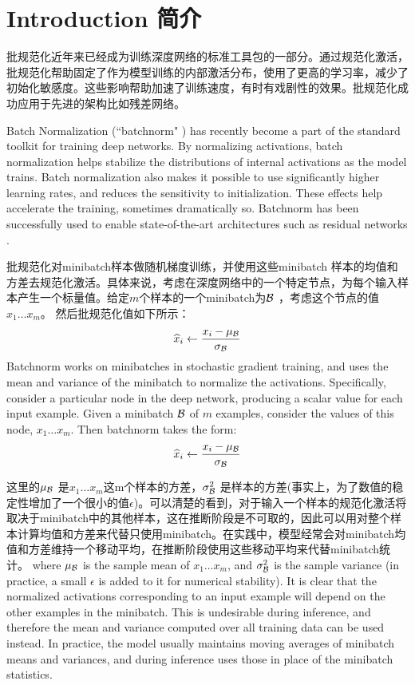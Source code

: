 \section{Introduction 简介}
批规范化近年来已经成为训练深度网络的标准工具包的一部分。通过规范化激活，批规范化帮助固定了作为模型训练的内部激活分布，使用了更高的学习率，减少了初始化敏感度。这些影响帮助加速了训练速度，有时有戏剧性的效果。批规范化成功应用于先进的架构比如残差网络。

Batch Normalization (``batchnorm" \cite{batchnorm}) has recently become a part of the standard toolkit for training deep networks. By normalizing activations, batch normalization helps stabilize the distributions of internal activations as the model trains. Batch normalization also makes it possible to use significantly higher learning rates, and reduces the sensitivity to initialization. These effects help accelerate the training, sometimes dramatically so. Batchnorm has been successfully used to enable  state-of-the-art architectures such as residual networks \cite{resnet}.

批规范化对minibatch样本做随机梯度训练，并使用这些minibatch 样本的均值和方差去规范化激活。具体来说，考虑在深度网络中的一个特定节点，为每个输入样本产生一个标量值。给定$m$个样本的一个minibatch为$\mathcal{B}$ ，考虑这个节点的值$x_1\ldots x_m$。 然后批规范化值如下所示：
$$
\widehat{x}_i \leftarrow \frac{x_i-\mu_{\mathcal{B}}}{\sigma_{\mathcal{B}}}
$$
Batchnorm works on minibatches in stochastic gradient training, and uses the mean and variance of the minibatch  to normalize the activations. Specifically, consider a particular node in the deep network, producing a scalar value for each input example. Given a minibatch $\mathcal{B}$ of $m$ examples, consider the values of this node, $x_1\ldots x_m$. Then batchnorm takes the form:
$$
\widehat{x}_i \leftarrow \frac{x_i-\mu_{\mathcal{B}}}{\sigma_{\mathcal{B}}}
$$

这里的$\mu_{\mathcal{B}}$ 是$x_1\ldots x_m$这m个样本的方差，$\sigma_{\mathcal{B}}^2$ 是样本的方差(事实上，为了数值的稳定性增加了一个很小的值$\epsilon$)。可以清楚的看到，对于输入一个样本的规范化激活将取决于minibatch中的其他样本，这在推断阶段是不可取的，因此可以用对整个样本计算均值和方差来代替只使用minibatch。在实践中，模型经常会对minibatch均值和方差维持一个移动平均，在推断阶段使用这些移动平均来代替minibatch统计。
where $\mu_{\mathcal{B}}$ is the sample mean of $x_1\ldots x_m$, and $\sigma_{\mathcal{B}}^2$ is the sample variance (in practice, a small $\epsilon$ is added to it for numerical stability). It is clear that the normalized activations corresponding to an input example will depend on the other examples in the  minibatch. This is undesirable during inference, and therefore the mean and variance computed over all training data can be used instead. In practice, the model usually maintains moving averages of minibatch means and variances, and during inference uses those in place of the minibatch statistics.

